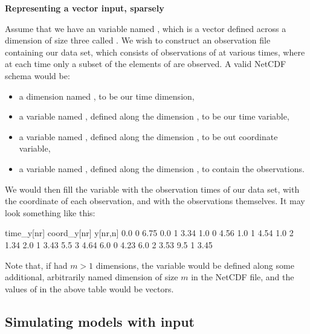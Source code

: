 \begin{example}
\noindent \textbf{Representing a vector input, sparsely}

Assume that we have an  variable named , which is a vector
defined across a dimension of size three called . We wish to construct
an observation file containing our data set, which consists of observations of
 at various times, where at each time only a subset of the elements of
 are observed. A valid NetCDF schema would be:
\begin{itemize}
\item a dimension named , to be our time dimension,
\item a variable named , defined along the dimension ,
  to be our time variable,
\item a variable named , defined along the dimension ,
  to be out coordinate variable,
\item a variable named , defined along the dimension , to
  contain the observations.
\end{itemize}
We would then fill the variable  with the observation times of
our data set,  with the coordinate of each observation, and
 with the observations themselves. It may look something like this:

\begin{cmdcode}
time_y[nr]    coord_y[nr]    y[nr,n]
       0.0             0       6.75
       0.0             1       3.34
       1.0             0       4.56
       1.0             1       4.54
       1.0             2       1.34
       2.0             1       3.43
       5.5             3       4.64
       6.0             0       4.23
       6.0             2       3.53
       9.5             1       3.45
\end{cmdcode}

Note that, if  had $m > 1$ dimensions, the 
variable would be defined along some additional, arbitrarily named dimension
of size $m$ in the NetCDF file, and the values of  in the above
table would be vectors.
\end{example}

\subsection{Simulating models with input\label{Simulating_models_with_input}}

